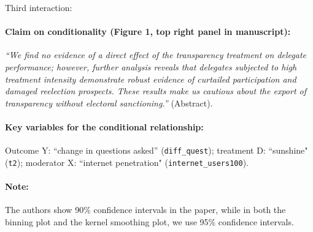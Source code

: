 \documentclass[12pt]{article}
\begin{document}
\clearpage






\noindent Third interaction:

\paragraph{Claim on conditionality (Figure 1, top right panel in manuscript):} \emph{``We find no evidence of a direct effect of the transparency treatment on delegate performance; however,
further analysis reveals that delegates subjected to high treatment intensity demonstrate robust evidence of curtailed participation and damaged reelection prospects. These results make us cautious about the export of transparency without electoral sanctioning.''} (Abstract). 


\paragraph{Key variables for the conditional relationship:} Outcome Y:
``change in questions asked'' (\texttt{diff\_quest}); treatment D: ``sunshine" (\texttt{t2}); moderator X: ``internet penetration"
(\texttt{internet\_users100}).

\paragraph{Note:} The authors show 90\% confidence intervals in the paper, while in both the binning plot and the kernel smoothing plot, we use 95\% confidence intervals.

\newpage
\end{document}
